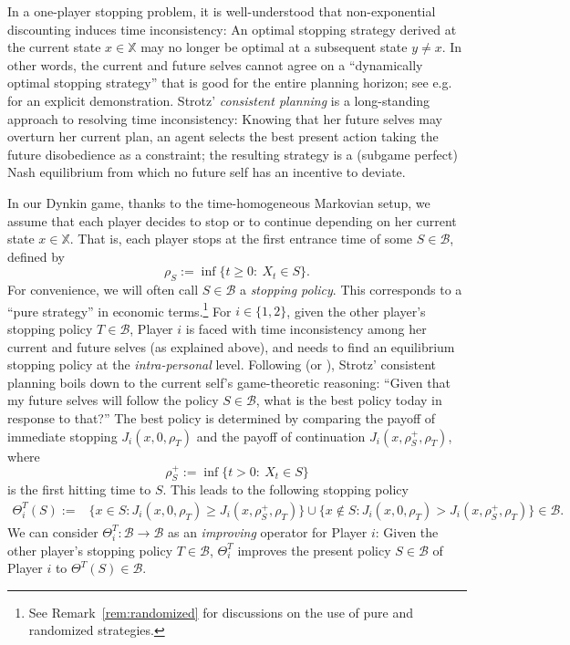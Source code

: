 \documentclass[11pt,reqno]{article}
\numberwithin{equation}{section}
\newcommand{\X}{\mathbb{X}}
\newcommand{\B}{\mathcal{B}}
\begin{document}
In a one-player stopping problem, it is well-understood that non-exponential discounting induces time inconsistency: An optimal stopping strategy derived at the current state $x\in\X$ may no longer be optimal at a subsequent state $y\neq x$. In other words, the current and future selves cannot agree on a ``dynamically optimal stopping strategy'' that is good for the entire planning horizon; see e.g. \cite[Section 2.2]{HN18} for an explicit demonstration. Strotz' {\it consistent planning} \cite{Strotz55} is a long-standing approach to resolving time inconsistency: Knowing that her future selves may overturn her current plan, an agent selects the best present action taking the future disobedience as a constraint; the resulting strategy is a (subgame perfect) Nash equilibrium from which no future self has an incentive to deviate. 

In our Dynkin game, thanks to the time-homogeneous Markovian setup, we assume that each player decides to stop or to continue depending on her current state $x\in\X$. That is, each player stops at the first entrance time of some $S\in\B$, defined by %
\[
\rho_S:=\inf\{t\geq 0:\ X_t\in S\}. %
\]
For convenience, we will often call $S\in\B$ a {\it stopping policy}. This corresponds to a ``pure strategy'' in economic terms.\footnote{See Remark~\ref{rem:randomized} for discussions on the use of pure and randomized strategies.} For $i\in\{1,2\}$, given the other player's stopping policy  $T\in\B$, Player $i$ is faced with time inconsistency among her current and future selves (as explained above), and needs to find an equilibrium stopping policy at the {\it intra-personal} level. Following \cite[Section 2.1]{HZ20} (or \cite[Section 3.1]{HN18}), Strotz' consistent planning boils down to the current self's game-theoretic reasoning: ``Given that my future selves will follow the policy $S\in\B$, what is the best policy today in response to that?'' The best policy is determined by comparing the payoff of immediate stopping $J_i(x,0,\rho_T)$ and the payoff of continuation $J_i(x,\rho^+_S,\rho_T)$, where 
\[
\rho^+_S:=\inf\{t>0:\ X_t\in S\}
\]
is the first hitting time to $S$. This leads to the following stopping policy
\begin{align}\label{Theta}
\Theta_i^T(S):=&\{x\in S: J_i(x,0,\rho_T)\geq J_i(x,\rho^+_S,\rho_T)\}\cup\{x\notin S: J_i(x,0,\rho_T)>J_i(x,\rho^+_S,\rho_T)\}\in \B.
\end{align}
We can consider $\Theta^T_i:\B\to\B$ as an {\it improving} operator for Player $i$: Given the other player's stopping policy $T\in\B$, $\Theta^T_i$ improves the present policy $S\in\B$ of Player $i$ to $\Theta^T(S)\in\B$. 
\end{document}
